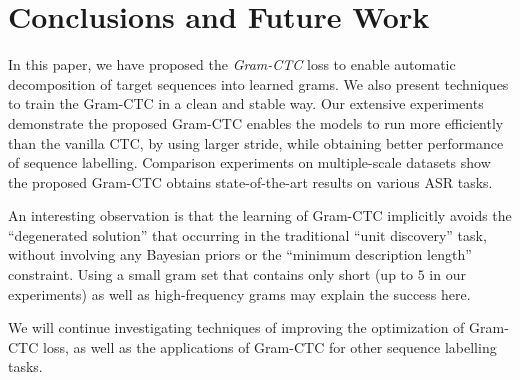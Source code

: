 \documentclass{article}
\begin{document}
\section{Conclusions and Future Work}

In this paper, we have proposed the \textit{Gram-CTC} loss to enable automatic decomposition of target sequences into learned grams. 
We also present techniques to train the Gram-CTC in a clean and stable way. 
Our extensive experiments demonstrate the proposed Gram-CTC enables the models to run more efficiently than the vanilla CTC, by using larger stride, while obtaining better performance of sequence labelling.
Comparison experiments on multiple-scale datasets show the proposed Gram-CTC obtains state-of-the-art results on various ASR tasks. 

An interesting observation is that the learning of Gram-CTC implicitly avoids the ``degenerated solution'' that occurring in the traditional ``unit discovery'' task, without involving any Bayesian priors or the ``minimum description length'' constraint. Using a small gram set that contains only short (up to $5$ in our experiments) as well as high-frequency grams may explain the success here. 

We will continue investigating techniques of improving the optimization of Gram-CTC loss, as well as the applications of Gram-CTC for other sequence labelling tasks.

\clearpage


\end{document}
